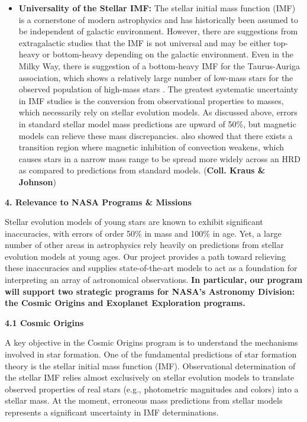 \begin{itemize}
	\item {\bf Universality of the Stellar IMF:} The stellar initial mass function (IMF) is a cornerstone of modern astrophysics and has historically been assumed to be independent of galactic environment. However, there are suggestions from extragalactic studies that the IMF is not universal and may be either top-heavy \citep{} or bottom-heavy \citep[e.g.,][]{vanDokkum2012} depending on the galactic environment. Even in the Milky Way, there is suggestion of a bottom-heavy IMF for the Taurus-Auriga association, which shows a relatively large number of low-mass stars for the observed population of high-mass stars \citep{Luhman2009}. The greatest systematic uncertainty in IMF studies is the conversion from observational properties to masses, which necessarily rely on stellar evolution models. As discussed above, errors in standard stellar model mass predictions are upward of 50\%, but magnetic models can relieve these mass discrepancies. \citet{Feiden2016} also showed that there exists a transition region where magnetic inhibition of convection weakens, which causes stars in a narrow mass range to be spread more widely across an HRD as compared to predictions from standard models. ({\bf Coll. Kraus \& Johnson}) \\

\end{itemize}



{\bf\large 4. Relevance to NASA Programs \& Missions}  

Stellar evolution models of young stars are known to exhibit significant inaccuracies, with errors of order 50\% in mass and 100\% in age. Yet, a large number of other areas in astrophysics rely heavily on predictions from stellar evolution models at young ages. Our project provides a path toward relieving these inaccuracies and supplies state-of-the-art models to act as a foundation for interpreting an array of astronomical observations. {\bf In particular, our program will support two strategic programs for NASA's Astronomy Division: the Cosmic Origins and Exoplanet Exploration programs.}

{\bf 4.1 Cosmic Origins}

A key objective in the Cosmic Origins program is to understand the mechanisms involved in star formation. One of the fundamental predictions of star formation theory is the stellar initial mass function (IMF). Observational determination of the stellar IMF relies almost exclusively on stellar evolution models to translate observed properties of real stars (e.g., photometric magnitudes and colors) into a stellar mass. At the moment, erroneous mass predictions from stellar models represents a significant uncertainty in IMF determinations. 

